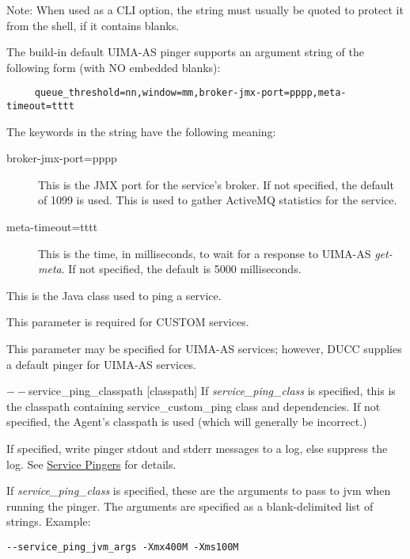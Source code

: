 \begin{description}
        Note: When used as a CLI option, the string must usually be
        quoted to protect it from the shell, if it contains blanks.

        The build-in default UIMA-AS pinger supports an argument string of the following form
        (with NO embedded blanks):
\begin{verbatim}
     queue_threshold=nn,window=mm,broker-jmx-port=pppp,meta-timeout=tttt
\end{verbatim}
        
        The keywords in the string have the following meaning:
        \begin{description}
          \item[broker-jmx-port=pppp] This is the JMX port for the service's broker.  If not
            specified, the default of 1099 is used.  This is used to gather ActiveMQ statistics
            for the service.
          \item[meta-timeout=tttt] This is the time, in milliseconds, to wait for a response
            to UIMA-AS {\em get-meta}.  If not specified, the default is 5000 milliseconds.
        \end{description}
      
      \item[$--$service\_ping\_class {[classname]}] This is the Java class used to ping a service. 

        This parameter is required for CUSTOM services.

        This parameter may be specified for UIMA-AS services; however, DUCC supplies a default
        pinger for UIMA-AS services.

      \begin{sloppypar}  
      \item[$--$service\_ping\_classpath {[classpath]}] If {\em service\_ping\_class} is specified,
        this is the classpath containing service\_custom\_ping class and dependencies.  If not
        specified, the Agent's classpath is used (which will generally be incorrect.)
      \end{sloppypar}
      
      \item[$--$service\_ping\_dolog {[true or false]}] If specified, write pinger stdout and stderr
        messages to a log, else suppress the log. See \hyperref[sec:service.pingers]{Service Pingers}
        for details.

      \item[$--$service\_ping\_jvm\_args {[string]}] If 
        {\em service\_ping\_class} is specified, these are the arguments 
        to pass to jvm when running the pinger. The arguments are specified as a blank-delimited
        list of strings.  Example:
\begin{verbatim}
--service_ping_jvm_args -Xmx400M -Xms100M
\end{verbatim}
        

\end{description}
